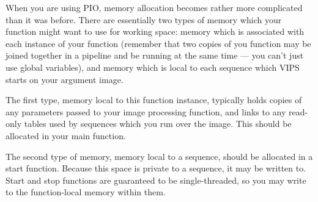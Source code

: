 When you are using PIO, memory allocation becomes rather more complicated than
it was before. There are essentially two types of memory which your function
might want to use for working space: memory which is associated with each
instance of your function (remember that two copies of you function may be
joined together in a pipeline and be running at the same time --- you can't
just use global variables), and memory which is local to each sequence
which VIPS starts on your argument image.

The first type, memory local to this function instance, typically holds
copies of any parameters passed to your image processing function, and links
to any read-only tables used by sequences which you run over the image. This
should be allocated in your main function.

The second type of memory, memory local to a sequence, should be allocated
in a start function. Because this space is private to a sequence, it may be
written to. Start and stop functions are guaranteed
to be single-threaded, so you may write to the function-local memory within 
them.

